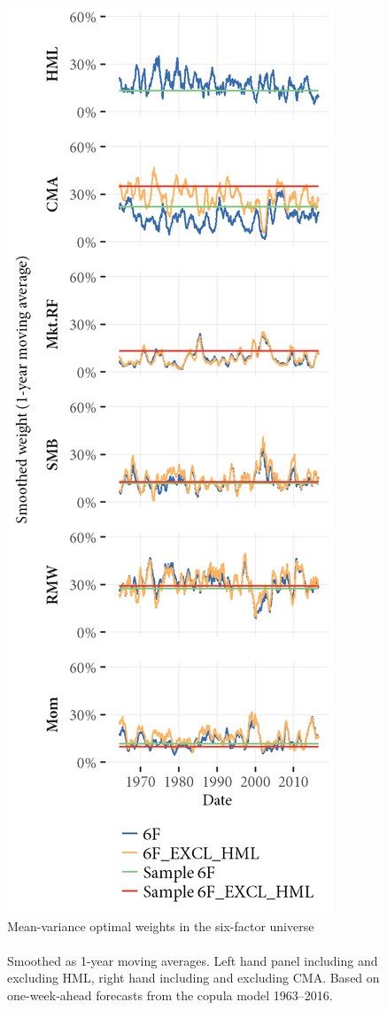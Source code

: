 \begin{figure}[htbp]
  \centering
  \footnotesize
  \renewcommand{\arraystretch}{1.2}
  \caption{Mean-variance optimal weights in the six-factor universe \\ \quad \\ Smoothed as 1-year moving averages. Left hand panel including and excluding HML, right hand including and excluding CMA. Based on one-week-ahead forecasts from the copula model 1963--2016.}
  \label{fig:mv_optimal_6}
  \includegraphics[scale = 1]{graphics/Weights_6F_EXCL_HML_6F.png}

\end{figure}
